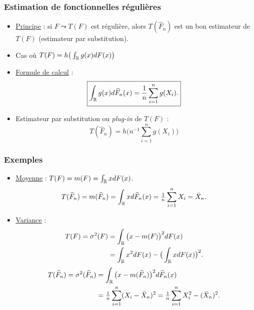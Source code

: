 \begin{frame}
\frametitle{Estimation de fonctionnelles régulières}
\begin{itemize}
\item \underline{Principe} : si $F \leadsto T(F)$ est \alert{régulière},
alors $T(\widehat F_n)$  est un \alert{bon}  estimateur de $T(F)$ (estimateur par substitution).
\item Cas où $T(F) = h\big(\int_{\operatorname{{\mathbb R}}}g(x)dF(x)\big)$
\item \underline{Formule de calcul} :
$$\boxed{\int_{\operatorname{{\mathbb R}}}g(x)d\widehat F_n(x) =
\frac{1}{n}\sum_{i = 1}^n g(X_i).}$$ 
\item Estimateur par \alert{substitution} ou {\it plug-in} de $T(F)$ :
$$\boxed{T(\widehat F_n) = h\Big(n^{-1} \sum_{i = 1}^ng(X_i)\Big)}$$
\end{itemize}
\end{frame}




\begin{frame}
\frametitle{Exemples}
\begin{itemize}
\item \underline{Moyenne} : $T(F)=m(F) = \int_{\operatorname{{\mathbb R}}}xdF(x)$.
$$
T(\widehat F_n)=m(\widehat F_n)=\int _{\operatorname{{\mathbb R}}}xd\widehat F_n(x)=
\tfrac{1}{n}\sum_{i = 1}^n X_i  = \bar X_n.
$$
\item \underline{Variance} :
\begin{align*}
T(F)=\sigma^2(F) & = \int_{\operatorname{{\mathbb R}}}\big(x-m(F)\big)^2dF(x)\\
& = \int_{\operatorname{{\mathbb R}}}x^2 dF(x)-\big(\int_{\operatorname{{\mathbb R}}}xdF(x)\big)^2.
\end{align*}
\begin{align*}
T(\widehat F_n)=\sigma^2(\widehat F_n) & =
\int_{\operatorname{{\mathbb R}}}\big(x-m(\widehat F_n)\big)^2d\widehat F_n(x) \\
& = \tfrac{1}{n}\sum_{i = 1}^n (X_i-\bar X_n)^2= \tfrac{1}{n}\sum_{i
= 1}^n X_i^2-(\bar X_n)^2.
\end{align*}
\end{itemize}
\end{frame}

